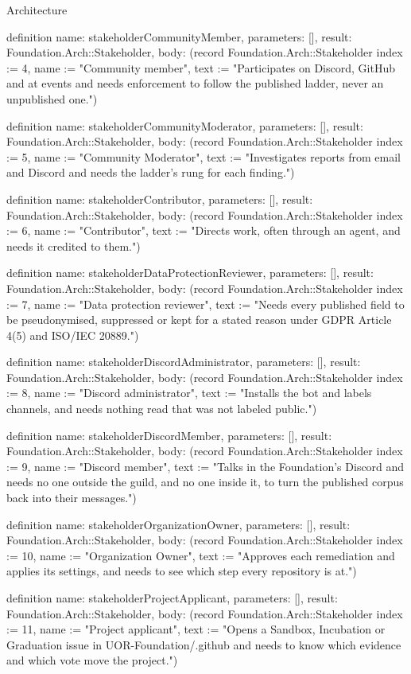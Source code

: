 \begin{lexlean}{Architecture}
\begin{semanticmodule}
definition{
  name: stakeholderCommunityMember,
  parameters: [],
  result: Foundation.Arch::Stakeholder,
  body: (record Foundation.Arch::Stakeholder {index := 4, name := "Community member", text := "Participates on Discord, GitHub and at events and needs enforcement to follow the published ladder, never an unpublished one."})
}

definition{
  name: stakeholderCommunityModerator,
  parameters: [],
  result: Foundation.Arch::Stakeholder,
  body: (record Foundation.Arch::Stakeholder {index := 5, name := "Community Moderator", text := "Investigates reports from email and Discord and needs the ladder's rung for each finding."})
}

definition{
  name: stakeholderContributor,
  parameters: [],
  result: Foundation.Arch::Stakeholder,
  body: (record Foundation.Arch::Stakeholder {index := 6, name := "Contributor", text := "Directs work, often through an agent, and needs it credited to them."})
}

definition{
  name: stakeholderDataProtectionReviewer,
  parameters: [],
  result: Foundation.Arch::Stakeholder,
  body: (record Foundation.Arch::Stakeholder {index := 7, name := "Data protection reviewer", text := "Needs every published field to be pseudonymised, suppressed or kept for a stated reason under GDPR Article 4(5) and ISO/IEC 20889."})
}

definition{
  name: stakeholderDiscordAdministrator,
  parameters: [],
  result: Foundation.Arch::Stakeholder,
  body: (record Foundation.Arch::Stakeholder {index := 8, name := "Discord administrator", text := "Installs the bot and labels channels, and needs nothing read that was not labeled public."})
}

definition{
  name: stakeholderDiscordMember,
  parameters: [],
  result: Foundation.Arch::Stakeholder,
  body: (record Foundation.Arch::Stakeholder {index := 9, name := "Discord member", text := "Talks in the Foundation's Discord and needs no one outside the guild, and no one inside it, to turn the published corpus back into their messages."})
}

definition{
  name: stakeholderOrganizationOwner,
  parameters: [],
  result: Foundation.Arch::Stakeholder,
  body: (record Foundation.Arch::Stakeholder {index := 10, name := "Organization Owner", text := "Approves each remediation and applies its settings, and needs to see which step every repository is at."})
}

definition{
  name: stakeholderProjectApplicant,
  parameters: [],
  result: Foundation.Arch::Stakeholder,
  body: (record Foundation.Arch::Stakeholder {index := 11, name := "Project applicant", text := "Opens a Sandbox, Incubation or Graduation issue in UOR-Foundation/.github and needs to know which evidence and which vote move the project."})
}


\end{semanticmodule}
\end{lexlean}
